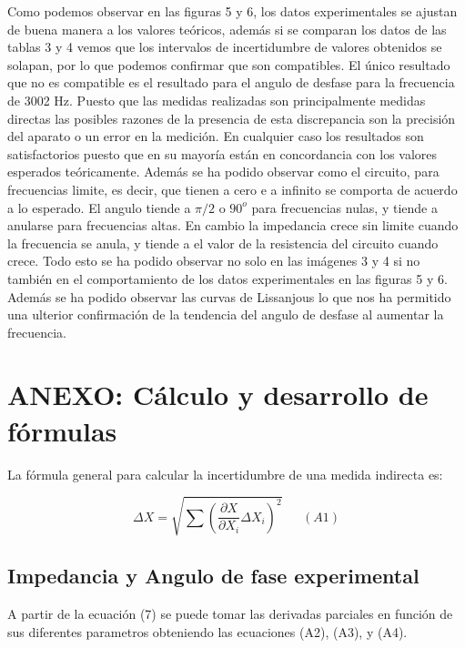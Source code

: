 \documentclass[article, 11pt]{report}
\newcommand{\dpartial}[2]{\frac{\partial #1 }{\partial #2}}
\begin{document}
Como podemos observar en las figuras 5 y 6, los datos experimentales se ajustan de buena manera a los valores teóricos, además si se comparan los datos de las tablas 3 y 4 vemos que los intervalos de incertidumbre de valores obtenidos se solapan, por lo que podemos confirmar que son compatibles. El único resultado que no es compatible es el resultado para el angulo de desfase para la frecuencia de 3002 Hz. Puesto que las medidas realizadas son principalmente medidas directas las posibles razones de la presencia de esta discrepancia son la precisión del aparato o un error en la medición. En cualquier caso los resultados son satisfactorios puesto que en su mayoría están en concordancia con los valores esperados teóricamente. Además se ha podido observar como el circuito, para frecuencias limite, es decir, que tienen a cero e a infinito se comporta de acuerdo a lo esperado. El angulo tiende a $\pi/2$ o $90^o$ para frecuencias nulas, y tiende a anularse para frecuencias altas. En cambio la impedancia crece sin limite cuando la frecuencia se anula, y tiende a el valor de la resistencia del circuito cuando crece. Todo esto se ha podido observar no solo en las imágenes 3 y 4 si no también en el comportamiento de los datos experimentales en las figuras 5 y 6. Además se ha podido observar las curvas de Lissanjous lo que nos ha permitido una ulterior confirmación de la tendencia del angulo de desfase al aumentar la frecuencia.

\newpage
	
\section{ ANEXO: Cálculo  y desarrollo de fórmulas}


La fórmula general para calcular la incertidumbre de una medida indirecta es:


$$	\Delta X = \sqrt{\sum{(\dpartial{X}{X_i} \Delta X_i)^2}}  ~~~~~~~(A1)$$






\subsection*{Impedancia y Angulo de fase experimental} \label{5.1}


A partir de la ecuación (7) se puede tomar las derivadas parciales en función de sus diferentes parametros obteniendo las ecuaciones (A2), (A3), y (A4).
\end{document}
